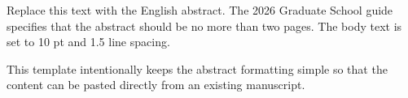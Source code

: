 \begin{yonseiabstract}
Replace this text with the English abstract. The 2026 Graduate School guide specifies that the abstract should be no more than two pages. The body text is set to 10 pt and 1.5 line spacing.

This template intentionally keeps the abstract formatting simple so that the content can be pasted directly from an existing manuscript.

\end{yonseiabstract}

